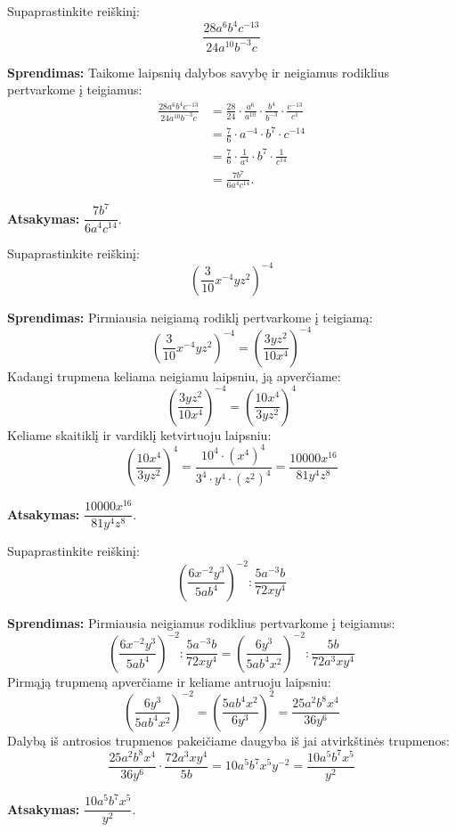 \documentclass[11pt,a4paper]{scrartcl}
\begin{document}
\begin{example}
Supaprastinkite reiškinį:
$$\frac{28a^6b^4c^{-13}}{24a^{10}b^{-3}c}$$

\textbf{Sprendimas:} Taikome laipsnių dalybos savybę ir neigiamus rodiklius pertvarkome į teigiamus:
\[
\begin{aligned}
\frac{28a^6b^4c^{-13}}{24a^{10}b^{-3}c}
&= \frac{28}{24} \cdot \frac{a^6}{a^{10}} \cdot \frac{b^4}{b^{-3}} \cdot \frac{c^{-13}}{c^1} \\
&= \frac{7}{6} \cdot a^{-4} \cdot b^7 \cdot c^{-14} \\
&= \frac{7}{6} \cdot \frac{1}{a^4} \cdot b^7 \cdot \frac{1}{c^{14}} \\
&= \frac{7b^7}{6a^4c^{14}}.
\end{aligned}
\]

\textbf{Atsakymas:} $\dfrac{7b^7}{6a^4c^{14}}$.
\end{example}

\begin{example}
Supaprastinkite reiškinį:
$$\left(\frac{3}{10}x^{-4}yz^2\right)^{-4}$$

\textbf{Sprendimas:} Pirmiausia neigiamą rodiklį pertvarkome į teigiamą:
$$\left(\frac{3}{10}x^{-4}yz^2\right)^{-4} = \left(\frac{3yz^2}{10x^4}\right)^{-4}$$
Kadangi trupmena keliama neigiamu laipsniu, ją apverčiame:
$$\left(\frac{3yz^2}{10x^4}\right)^{-4} = \left(\frac{10x^4}{3yz^2}\right)^4$$
Keliame skaitiklį ir vardiklį ketvirtuoju laipsniu:
$$\left(\frac{10x^4}{3yz^2}\right)^4 = \frac{10^4 \cdot (x^4)^4}{3^4 \cdot y^4 \cdot (z^2)^4} = \frac{10000x^{16}}{81y^4z^8}$$

\textbf{Atsakymas:} $\dfrac{10000x^{16}}{81y^4z^8}$.
\end{example}

\begin{example}
Supaprastinkite reiškinį:
$$\left(\frac{6x^{-2}y^3}{5ab^4}\right)^{-2} : \frac{5a^{-3}b}{72xy^4}$$

\textbf{Sprendimas:} Pirmiausia neigiamus rodiklius pertvarkome į teigiamus:
$$\left(\frac{6x^{-2}y^3}{5ab^4}\right)^{-2} : \frac{5a^{-3}b}{72xy^4} = \left(\frac{6y^3}{5ab^4x^2}\right)^{-2} : \frac{5b}{72a^3xy^4}$$
Pirmąją trupmeną apverčiame ir keliame antruoju laipsniu:
$$\left(\frac{6y^3}{5ab^4x^2}\right)^{-2} = \left(\frac{5ab^4x^2}{6y^3}\right)^2 = \frac{25a^2b^8x^4}{36y^6}$$
Dalybą iš antrosios trupmenos pakeičiame daugyba iš jai atvirkštinės trupmenos:
$$\frac{25a^2b^8x^4}{36y^6} \cdot \frac{72a^3xy^4}{5b} = 10a^5b^7x^5y^{-2} = \frac{10a^5b^7x^5}{y^2}$$

\textbf{Atsakymas:} $\dfrac{10a^5b^7x^5}{y^2}$.
\end{example}
\end{document}

